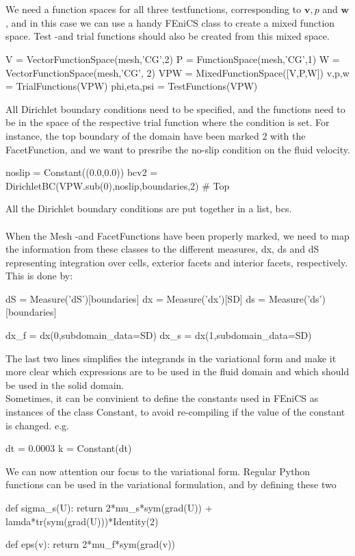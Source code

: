 \\ \\	
We need a function spaces for all three testfunctions, corresponding to $\mathbf{v}, p$ and $\mathbf{w}$, and in this case we can use a handy FEniCS class to create a mixed function space. Test -and trial functions should also be created from this mixed space.
\begin{cverbatim}
V = VectorFunctionSpace(mesh,'CG',2)
P = FunctionSpace(mesh,'CG',1)
W = VectorFunctionSpace(mesh,'CG', 2)
VPW = MixedFunctionSpace([V,P,W])
v,p,w = TrialFunctions(VPW)
phi,eta,psi = TestFunctions(VPW)
\end{cverbatim}
All Dirichlet boundary conditions need to be specified, and the functions need to be in the space of the respective trial function where the condition is set. For instance, the top boundary of the domain have been marked 2 with the FacetFunction, and we want to presribe the no-slip condition on the fluid velocity.
\begin{cverbatim}
noslip = Constant((0.0,0.0))
bcv2 = DirichletBC(VPW.sub(0),noslip,boundaries,2) # Top
\end{cverbatim}
All the Dirichlet boundary conditions are put together in a list, bcs.\\ \\
When the Mesh -and FacetFunctions have been properly marked, we need to map the information from these classes to the different measures, dx, ds and dS representing integration over cells, exterior facets and interior facets, respectively. This is done by:
\begin{cverbatim}
dS = Measure('dS')[boundaries]
dx = Measure('dx')[SD]
ds = Measure('ds')[boundaries]

dx_f = dx(0,subdomain_data=SD)
dx_s = dx(1,subdomain_data=SD)
\end{cverbatim}
The last two lines simplifies the integrands in the variational form and make it more clear which expressions are to be used in the fluid domain and which should be used in the solid domain.
\\
Sometimes, it can be convinient to define the constants used in FEniCS as instances of the class Constant, to avoid re-compiling if the value of the constant is changed. e.g.
\begin{cverbatim}
dt = 0.0003
k = Constant(dt)
\end{cverbatim}
We can now attention our focus to the variational form. Regular Python functions can be used in the variational formulation, and by defining these two
\begin{cverbatim}
def sigma_s(U):
	return 2*mu_s*sym(grad(U)) + lamda*tr(sym(grad(U)))*Identity(2)

def eps(v):
	return 2*mu_f*sym(grad(v))
\end{cverbatim}
